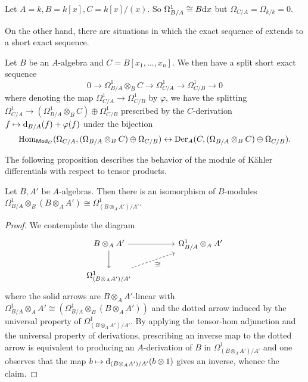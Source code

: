 \begin{example}
    Let $A=k, B=k[x], C=k[x]/(x)$. So $\Omega_{B/A}^{1}\cong B\mathrm{d} x$ but $\Omega_{C/A}=\Omega_{k/k}=0$. 
\end{example}
On the other hand, there are situations in which the exact sequence of  extends to a short exact sequence. 
\begin{example}
    Let $B$ be an $A$-algebra and $C=B[x_{1},\dots,x_{n}]$. We then have a split short exact sequence 
    $$0\to\Omega^{1}_{B/A}\otimes_{B}C\to\Omega_{C/A}^{1}\to\Omega_{C/B}^{1}\to 0$$
    where denoting the map $\Omega_{C/A}^{1}\to\Omega_{C/B}^{1}$ by $\varphi$, we have the splitting $\Omega_{C/A}^{1}\to(\Omega_{B/A}^{1}\otimes_{B}C)\oplus\Omega_{C/B}^{1}$ prescribed by the $C$-derivation $f\mapsto \mathrm{d}_{B/A}(f)+\varphi(f)$ under the bijection 
    $$\mathrm{Hom}_{\mathsf{Mod}_{C}}(\Omega_{C/A},(\Omega_{B/A}\otimes_{B}C)\oplus\Omega_{C/B})\leftrightarrow\mathrm{Der}_{A}(C,(\Omega_{B/A}\otimes_{B}C)\oplus\Omega_{C/B}).$$
\end{example}
The following proposition describes the behavior of the module of K\"{a}hler differentials with respect to tensor products. 
\begin{proposition}\label{prop: differentials of pushouts}
    Let $B,A'$ be $A$-algebras. Then there is an isomorphism of $B$-modules $\Omega_{B/A}^{1}\otimes_{B}(B\otimes_{A}A')\cong\Omega^{1}_{(B\otimes_{A}A')/A'}$. 
\end{proposition}
\begin{proof}
    We contemplate the diagram 
    $$%
    \begin{tikzcd}
        {B\otimes_{A}A'} && {\Omega^{1}_{B/A}\otimes_{A}A'} \\
        {\Omega_{(B\otimes_{A}A')/A'}^{1}}
        \arrow[from=1-1, to=1-3]
        \arrow[from=1-1, to=2-1]
        \arrow["{\exists!}"', dashed, from=2-1, to=1-3]
    \end{tikzcd}$$
    where the solid arrows are $B\otimes_{A}A'$-linear with $\Omega^{1}_{B/A}\otimes_{A}A'\cong(\Omega^{1}_{B/A}\otimes_{B}(B\otimes_{A}A'))$ and the dotted arrow induced by the universal property of $\Omega^{1}_{(B\otimes_{A}A')/A'}$. By applying the tensor-hom adjunction and the universal property of derivations, prescribing an inverse map to the dotted arrow is equivalent to producing an $A$-derivation of $B$ in $\Omega^{1}_{(B\otimes_{A}A')/A'}$ and one observes that the map $b\mapsto \mathrm{d}_{(B\otimes_{A}A')/A'}(b\otimes 1)$ gives an inverse, whence the claim. 
\end{proof}
